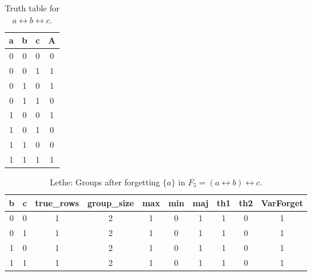 \begin{table}[!tb]
    \centering
    \begin{tabular}{|c|c|c|c|}
        \hline
        \textbf{a} & \textbf{b} & \textbf{c} & \textbf{A} \\ \hline
        0 & 0 & 0 & 0 \\ \hline
        0 & 0 & 1 & 1 \\ \hline
        0 & 1 & 0 & 1 \\ \hline
        0 & 1 & 1 & 0 \\ \hline
        1 & 0 & 0 & 1 \\ \hline
        1 & 0 & 1 & 0 \\ \hline
        1 & 1 & 0 & 0 \\ \hline
        1 & 1 & 1 & 1 \\ \hline
    \end{tabular}
    \caption{Truth table for $a \leftrightarrow b \leftrightarrow c$.}
    \label{tab:truthtab}
\end{table}

\begin{table}[!tb]
    \centering
    \begin{tabular}{|c|c|c|c|c|c|c|c|c|c|}
        \hline
        \textbf{b} & \textbf{c} & \textbf{true\_rows} & \textbf{group\_size} & \textbf{max} & \textbf{min} & \textbf{maj} & \textbf{th1} & \textbf{th2} & \textbf{VarForget} \\ \hline
        \rowcolor{gray!40} 0 & 0 & 1 & 2 & 1 & 0 & 1 & 1 & 0 & 1 \\ \hline
        \rowcolor{blue!40} 0 & 1 & 1 & 2 & 1 & 0 & 1 & 1 & 0 & 1 \\ \hline
        \rowcolor{red!40} 1 & 0 & 1 & 2 & 1 & 0 & 1 & 1 & 0 & 1 \\ \hline
        \rowcolor{green!40} 1 & 1 & 1 & 2 & 1 & 0 & 1 & 1 & 0 & 1 \\ \hline
    \end{tabular}
    \caption{Lethe: Groups after forgetting $\{a\}$ in $F_{5} = (a \leftrightarrow b) \leftrightarrow c$.}
    \label{tab:lethe-F5-a-groups}
\end{table}
